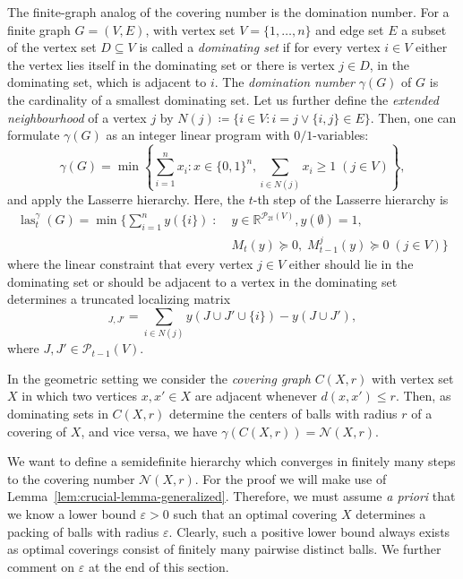 \documentclass{amsart}
\newcommand{\R}{\mathbb{R}}
\DeclareMathOperator{\las}{las}
\begin{document}
The finite-graph analog of the covering number is the domination
number. For a finite graph $G = (V, E)$, with vertex set
$V = \{1, \ldots, n\}$ and edge set $E$ a subset of the vertex set
$D \subseteq V$ is called a \emph{dominating set} if for every vertex
$i \in V$ either the vertex lies itself in the dominating set or there is vertex
$j \in D$, in the dominating set, which is adjacent to $i$. The
\emph{domination number} $\gamma(G)$ of $G$ is the cardinality of a
smallest dominating set. Let us further define the \emph{extended neighbourhood} of a vertex $j$ by $N(j)\coloneqq \{i\in V: i=j \lor \{i,j\}\in E\}$. Then, one can formulate $\gamma(G)$ as an integer
linear program with $0/1$-variables:
\[
 \gamma(G) =  \min\left\{\sum_{i=1}^n x_i : x \in \{0,1\}^n,
    \sum_{i \in N(j)} x_i \geq 1 \; (j \in V) \right\},
\]
and apply the Lasserre hierarchy. Here, the $t$-th step of the Lasserre
hierarchy is
\[
  \begin{split}
  \las^\gamma_t(G) = \min\Big\{ \sum_{i=1}^n  y(\{i\}) \; : \; & y \in
  \R^{\mathcal{P}_{2t}(V)}, y(\emptyset) = 1,\\[-3ex]
  & M_t(y) \succeq 0, \; M^j_{t-1}(y) \succeq 0 \; (j \in V)\Big\}
  \end{split}
\]
where the linear constraint that every vertex $j \in V$ either should
lie in the dominating set or should be adjacent to a vertex in the
dominating set determines a truncated localizing matrix
\begin{equation}
[M^j_{t-1}(y)]_{J,J'} = \sum_{i \in N(j)} y(J \cup J' \cup
\{i\}) - y(J \cup J'),\label{eq:truncated_localizing_matrix_finite}
\end{equation}
where $J, J' \in \mathcal{P}_{t-1}(V)$.

In the geometric setting we consider the \emph{covering graph} $C(X,r)$
with vertex set $X$ in which two vertices $x, x' \in X$ are adjacent
whenever $d(x,x') \leq r$. Then, as dominating sets in
$C(X,r)$ determine the centers of balls with radius $r$ of
a covering of $X$, and vice versa, we have
$\gamma(C(X,r)) = \mathcal{N}(X,r)$.

\smallskip

We want to define a semidefinite hierarchy which converges in finitely
many steps to the covering number $\mathcal{N}(X,r)$. For the proof we
will make use of Lemma~\ref{lem:crucial-lemma-generalized}. Therefore,
we must assume \emph{a priori} that we know a lower bound $\varepsilon > 0$ such that an
optimal covering $X$ determines a packing of balls with radius
$\varepsilon$. Clearly, such a positive lower bound always exists as
optimal coverings consist of finitely many pairwise distinct balls. We further comment on $\varepsilon$ at the end of this section.
\end{document}
